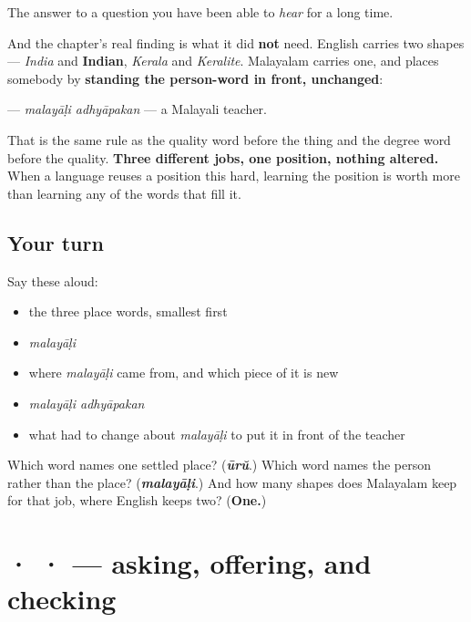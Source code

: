 \begin{grammarlens}[title={What you've built}]
The answer to a question you have been able to \emph{hear} for a long time.

And the chapter's real finding is what it did \textbf{not} need. English carries two shapes — \emph{India} and \textbf{Indian}, \emph{Kerala} and \emph{Keralite}. Malayalam carries one, and places somebody by \textbf{standing the person-word in front, unchanged}:

\textbf{ } — \emph{malayāḷi adhyāpakan} — a Malayali teacher.

That is the same rule as the quality word before the thing and the degree word before the quality. \textbf{Three different jobs, one position, nothing altered.} When a language reuses a position this hard, learning the position is worth more than learning any of the words that fill it.
\end{grammarlens}

\subsection*{Your turn}
Say these aloud:

\begin{itemize}
\raggedright
  \item the three place words, smallest first
  \item \emph{malayāḷi}
  \item where \emph{malayāḷi} came from, and which piece of it is new
  \item \emph{malayāḷi adhyāpakan}
  \item what had to change about \emph{malayāḷi} to put it in front of the teacher
\end{itemize}

\begin{tcolorbox}[breakable,colback=teal!4,colframe=teal!35!black,title={Before you move on}]
Which word names one settled place? (\emph{\textbf{ūrŭ}}.) Which word names the person rather than the place? (\emph{\textbf{malayāḷi}}.) And how many shapes does Malayalam keep for that job, where English keeps two? (\textbf{One.})
\end{tcolorbox}
\section[\texorpdfstring{\ml{ഊണ്} · \ml{വേണോ} · \ml{അല്ലേ} … (ūṇ · vēṇō · allē …)}{ഊണ് · വേണോ · അല്ലേ … (ūṇ · vēṇō · allē …)}]{ ·  ·  — asking, offering, and checking}

